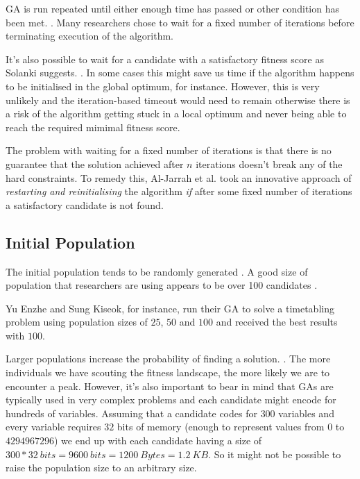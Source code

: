 \documentclass[a4paper, 12pt, titlepage]{article}
\begin{document}
GA is run repeated until either enough time has passed or other condition
has been met. \cite[p.~108]{eberhart2007}.
Many researchers chose to wait for a fixed number of iterations before
terminating execution of the algorithm. \cite[p.~3868]{solanki2015} \cite[p.~7078]{may2015} \cite{hosseinabadi2018}

It's also possible to wait for a candidate with a satisfactory fitness score as Solanki suggests. \cite[p.~3868]{solanki2015}. In some cases this might save us time if the algorithm happens to be initialised in the global optimum, for instance. However, this is very unlikely and the iteration-based timeout would need to remain otherwise there is a risk of the algorithm getting stuck in a local optimum and never being able to reach the required mimimal fitness score.

The problem with waiting for a fixed number of iterations is that there
is no guarantee that the solution achieved after \(n\) iterations doesn't
break any of the hard constraints. To remedy this, Al-Jarrah et al.
took an innovative approach of \emph{restarting and reinitialising} the algorithm
\emph{if} after some fixed number of iterations a satisfactory candidate is not found.
\cite[p.~28]{aljarrah2017} 

\subsection*{Initial Population}

The initial population tends to be randomly generated
\cite[p.~97]{mesghouni2004} \cite[p.~29]{aljarrah2017}.  
A good size of population that researchers are using appears to be
over 100 candidates \cite[p.~101]{mesghouni2004} \cite[p.~16]{timilsina2015}
\cite{hosseinabadi2018}.

Yu Enzhe and Sung Kiseok, for instance, run their GA to solve
a timetabling problem using population sizes of \(25\), \(50\) and
\(100\) and received the best results with \(100\). \cite[p.~715]{yu2002}

Larger populations increase the probability of finding a solution.
\cite[p.~12]{timilsina2015}. The more individuals we have scouting the
fitness landscape, the more likely we are to encounter a peak.
However, it's also important to bear in mind that GAs are typically used 
in very complex problems and each candidate might encode for hundreds
of variables. Assuming that a candidate codes for \(300\) variables and
every variable requires \(32\) bits of memory (enough to represent values
from \(0\) to \(4294967296\)) we end up with each candidate having a
size of \(300 * 32\ bits = 9600\ bits = 1200\ Bytes = 1.2\ KB\).  So it
might not be possible to raise the population size to an arbitrary size.
\end{document}
